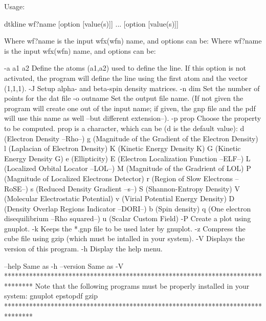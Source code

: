 Usage:

	dtkline wf?name [option [value(s)]] ... [option [value(s)]]

Where wf?name is the input wfx(wfn) name, and options can be:
Where wf?name is the input wfx(wfn) name, and options can be:

  -a a1 a2  	Define the atoms  (a1,a2) used to define the line.
            	  If this option is not activated, the program will 
            	  define the line using the first atom and the vector
            	  (1,1,1).
  -J        	Setup alpha- and beta-spin density matrices.
  -n  dim   	Set the number of points for the dat file
  -o outname	Set the output file name.
            	  (If not given the program will create one out of
            	  the input name; if given, the gnp file and the pdf will
            	  use this name as well --but different extension--).
  -p prop	Choose the property to be computed. prop is a character,
         	  which can be (d is the default value): 
         		d (Electron Density --Rho--)
         		g (Magnitude of the Gradient of the Electron Density)
         		l (Laplacian of Electron Density)
         		K (Kinetic Energy Density K)
         		G (Kinetic Energy Density G)
         		e (Ellipticity)
         		E (Electron Localization Function --ELF--)
         		L (Localized Orbital Locator --LOL--)
         		M (Magnitude of the Gradrient of LOL)
         		P (Magnitude of Localized Electrons Detector)
         		r (Region of Slow Electrons --RoSE--)
         		s (Reduced Density Gradient --s--)
         		S (Shannon-Entropy Density)
         		V (Molecular Electrostatic Potential)
         		v (Virial Potential Energy Density)
         		D (Density Overlap Regions Indicator --DORI--)
         		b (Spin density)
         		q (One electron disequilibrium --Rho squared--)
         		u (Scalar Custom Field)
  -P     	Create a plot using gnuplot.
  -k     	Keeps the *.gnp file to be used later by gnuplot.
  -z     	Compress the cube file using gzip (which must be intalled
         	   in your system).
  -V        	Displays the version of this program.
  -h     	Display the help menu.

  --help    		Same as -h
  --version 		Same as -V
********************************************************************************
  Note that the following programs must be properly installed in your system:
                                    gnuplot
                                    epstopdf
                                      gzip
********************************************************************************
